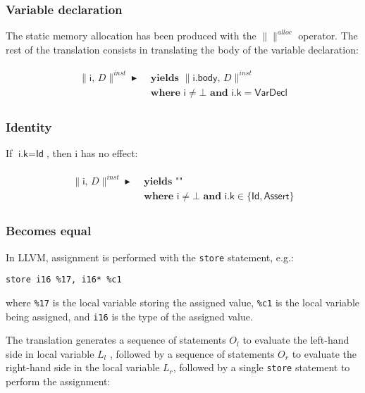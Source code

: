 \documentclass{article}
\newcommand{\trad}[2]{\ensuremath{\lVert \textsf{#1} \rVert^{\textit{#2}}}}
\newcommand{\mty}[0]{\texttt{""}}
\DeclareMathOperator{\isdef}{\blacktriangleright}
\begin{document}
\subsubsection{Variable declaration}

The static memory allocation has been produced with the $\trad{}{alloc}$
operator. The rest of the translation consists in translating the body
of the variable declaration:

\begin{framed}
\begin{align}
\begin{split}
  \trad{i, $D$}{inst} \isdef 
  & \textbf{ yields } \trad{i.body, $D$}{inst} \\
  & \textbf{ where } \textsf{i} \ne \bot \textbf{ and } \textsf{i.k} = \textsf{VarDecl} 
\end{split}
\end{align}
\end{framed}

\subsubsection{Identity}

If $\textsf{i.k} = \textsf{Id}$, then \textsf{i} has no effect:

\begin{framed}
\begin{align}
\begin{split}
  \trad{i, $D$}{inst} \isdef 
  & \textbf{ yields } \mty \label{trad:id} \\
  & \textbf{ where } \textsf{i} \ne \bot \textbf{ and } \textsf{i.k} \in \{ \textsf{Id}, \textsf{Assert} \} 
\end{split}
\end{align}
\end{framed}

\subsubsection{Becomes equal}

In LLVM, assignment is performed with the \texttt{store} statement, e.g.:
\begin{verbatim}
store i16 %17, i16* %c1
\end{verbatim}
where \texttt{\%17} is the local variable storing the assigned value,
\texttt{\%c1} is the local variable being assigned, and \texttt{i16}
is the type of the assigned value.

The translation generates a sequence of statements $O_l$ to evaluate
the left-hand side in local variable $L_l$ , followed by a sequence of
statements $O_r$ to evaluate the right-hand side in the local variable
$L_r$, followed by a single \verb'store' statement to perform the
assignment:
\end{document}
